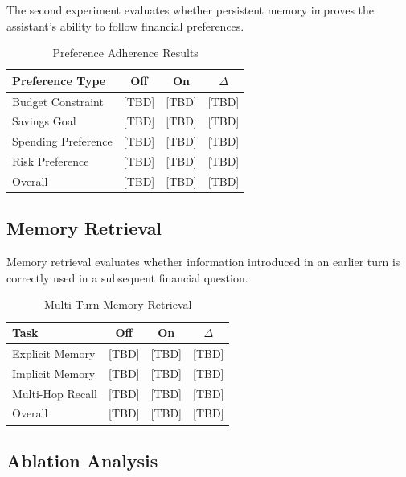 \documentclass[conference]{IEEEtran}
\begin{document}
    The second experiment evaluates whether persistent memory improves the
    assistant's ability to follow financial preferences.
    
    \begin{table}[t]
    \centering
    \caption{Preference Adherence Results}
    \label{tab:preference}
    \begin{tabular}{lccc}
    \toprule
    \textbf{Preference Type} & \textbf{Off} & \textbf{On} & \textbf{$\Delta$} \\
    \midrule
    Budget Constraint & [TBD] & [TBD] & [TBD] \\
    Savings Goal & [TBD] & [TBD] & [TBD] \\
    Spending Preference & [TBD] & [TBD] & [TBD] \\
    Risk Preference & [TBD] & [TBD] & [TBD] \\
    Overall & [TBD] & [TBD] & [TBD] \\
    \bottomrule
    \end{tabular}
    \end{table}
    
    \subsection{Memory Retrieval}
    
    Memory retrieval evaluates whether information introduced in an earlier
    turn is correctly used in a subsequent financial question.
    
    \begin{table}[t]
    \centering
    \caption{Multi-Turn Memory Retrieval}
    \label{tab:memory}
    \begin{tabular}{lccc}
    \toprule
    \textbf{Task} & \textbf{Off} & \textbf{On} & \textbf{$\Delta$} \\
    \midrule
    Explicit Memory & [TBD] & [TBD] & [TBD] \\
    Implicit Memory & [TBD] & [TBD] & [TBD] \\
    Multi-Hop Recall & [TBD] & [TBD] & [TBD] \\
    Overall & [TBD] & [TBD] & [TBD] \\
    \bottomrule
    \end{tabular}
    \end{table}
    
    \subsection{Ablation Analysis}
    
\end{document}
